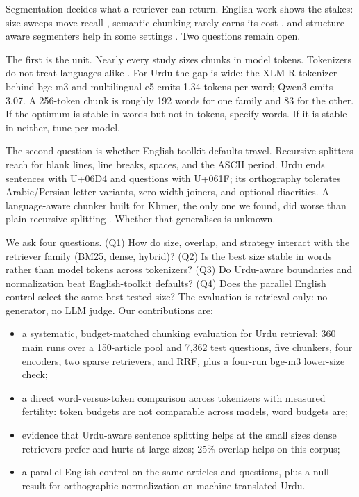 \documentclass[11pt]{article}
\begin{document}
Segmentation decides what a retriever can return. English work shows the stakes: size sweeps move
recall \citep{bhat2025rethinking,bennani2026a,wang2024searching}, semantic chunking rarely earns its
cost \citep{qu2024is}, and structure-aware segmenters help in some settings
\citep{yepes2024financial,singh2026parser}. Two questions remain open.

The first is the unit. Nearly every study sizes chunks in model tokens. Tokenizers do not treat
languages alike \citep{petrov2023language,ahia2023do,srivastava2026the}. For Urdu the gap is wide:
the XLM-R tokenizer behind bge-m3 and multilingual-e5 emits 1.34 tokens per word; Qwen3 emits 3.07.
A 256-token chunk is roughly 192 words for one family and 83 for the other. If the optimum is stable
in words but not in tokens, specify words. If it is stable in neither, tune per model.

The second question is whether English-toolkit defaults travel. Recursive splitters reach for blank
lines, line breaks, spaces, and the ASCII period. Urdu ends sentences with U+06D4 and questions with
U+061F; its orthography tolerates Arabic/Persian letter variants, zero-width joiners, and optional
diacritics. A language-aware chunker built for Khmer, the only one we found, did worse than plain
recursive splitting \citep{chhoun2026evaluation}. Whether that generalises is unknown.

We ask four questions. (Q1) How do size, overlap, and strategy interact with the retriever family
(BM25, dense, hybrid)? (Q2) Is the best size stable in words rather than model tokens across
tokenizers? (Q3) Do Urdu-aware boundaries and normalization beat English-toolkit defaults? (Q4) Does
the parallel English control select the same best tested size? The evaluation is retrieval-only: no
generator, no LLM judge. Our contributions are:
\begin{itemize}
\item a systematic, budget-matched chunking evaluation for Urdu retrieval: 360 main runs over a
  150-article pool and 7{,}362 test questions, five chunkers, four encoders, two sparse retrievers,
  and RRF, plus a four-run bge-m3 lower-size check;
\item a direct word-versus-token comparison across tokenizers with measured fertility: token budgets
  are not comparable across models, word budgets are;
\item evidence that Urdu-aware sentence splitting helps at the small sizes dense retrievers prefer
  and hurts at large sizes; 25\% overlap helps on this corpus;
\item a parallel English control on the same articles and questions, plus a null result for
  orthographic normalization on machine-translated Urdu.
\end{itemize}
\end{document}
